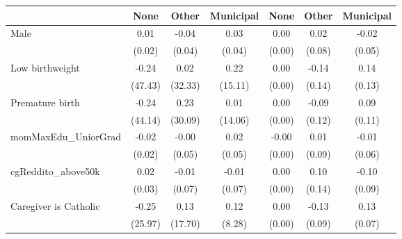 {
\def\sym#1{\ifmmode^{#1}\else\(^{#1}\)\fi}
\begin{tabular}{l*{6}{c}}
\toprule
                    &\multicolumn{1}{c}{None}&\multicolumn{1}{c}{Other}&\multicolumn{1}{c}{Municipal}&\multicolumn{1}{c}{None}&\multicolumn{1}{c}{Other}&\multicolumn{1}{c}{Municipal}\\
\midrule
Male                &        0.01         &       -0.04         &        0.03         &        0.00         &        0.02         &       -0.02         \\
                    &      (0.02)         &      (0.04)         &      (0.04)         &      (0.00)         &      (0.08)         &      (0.05)         \\
\addlinespace
Low birthweight     &       -0.24         &        0.02         &        0.22         &        0.00         &       -0.14         &        0.14         \\
                    &     (47.43)         &     (32.33)         &     (15.11)         &      (0.00)         &      (0.14)         &      (0.13)         \\
\addlinespace
Premature birth     &       -0.24         &        0.23         &        0.01         &        0.00         &       -0.09         &        0.09         \\
                    &     (44.14)         &     (30.09)         &     (14.06)         &      (0.00)         &      (0.12)         &      (0.11)         \\
\addlinespace
momMaxEdu\_UniorGrad &       -0.02         &       -0.00         &        0.02         &       -0.00         &        0.01         &       -0.01         \\
                    &      (0.02)         &      (0.05)         &      (0.05)         &      (0.00)         &      (0.09)         &      (0.06)         \\
\addlinespace
cgReddito\_above50k  &        0.02         &       -0.01         &       -0.01         &        0.00         &        0.10         &       -0.10         \\
                    &      (0.03)         &      (0.07)         &      (0.07)         &      (0.00)         &      (0.14)         &      (0.09)         \\
\addlinespace
Caregiver is Catholic&       -0.25         &        0.13         &        0.12         &        0.00         &       -0.13         &        0.13         \\
                    &     (25.97)         &     (17.70)         &      (8.28)         &      (0.00)         &      (0.09)         &      (0.07)         \\

\end{tabular}}

